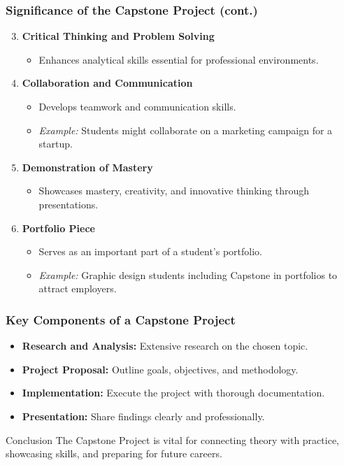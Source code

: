 \documentclass[aspectratio=169]{beamer}
\begin{document}
\begin{frame}[fragile]
    \frametitle{Significance of the Capstone Project (cont.)}
    \begin{enumerate}
        \setcounter{enumi}{2} %
        \item \textbf{Critical Thinking and Problem Solving}
            \begin{itemize}
                \item Enhances analytical skills essential for professional environments.
            \end{itemize}
        \item \textbf{Collaboration and Communication}
            \begin{itemize}
                \item Develops teamwork and communication skills.
                \item \textit{Example:} Students might collaborate on a marketing campaign for a startup.
            \end{itemize}
        \item \textbf{Demonstration of Mastery}
            \begin{itemize}
                \item Showcases mastery, creativity, and innovative thinking through presentations.
            \end{itemize}
        \item \textbf{Portfolio Piece}
            \begin{itemize}
                \item Serves as an important part of a student’s portfolio.
                \item \textit{Example:} Graphic design students including Capstone in portfolios to attract employers.
            \end{itemize}
    \end{enumerate}
\end{frame}

\begin{frame}[fragile]
    \frametitle{Key Components of a Capstone Project}
    \begin{itemize}
        \item \textbf{Research and Analysis:} Extensive research on the chosen topic.
        \item \textbf{Project Proposal:} Outline goals, objectives, and methodology.
        \item \textbf{Implementation:} Execute the project with thorough documentation.
        \item \textbf{Presentation:} Share findings clearly and professionally.
    \end{itemize}
    
    \begin{block}{Conclusion}
        The Capstone Project is vital for connecting theory with practice, showcasing skills, and preparing for future careers.
    \end{block}
\end{frame}
\end{document}
